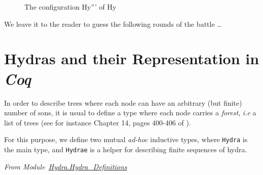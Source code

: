 \begin{figure}[hp]
\caption{The configuration Hy''' of Hy \label{fig:Hy5}}
\end{figure}
\FloatBarrier

We leave it to the reader  to guess the following  rounds of the battle \dots



\section{Hydras and their Representation in \emph{Coq}}
\label{sec:orgheadline48}



In order to describe trees where each node can have an arbitrary (but finite) number of sons, it is usual to define a type where each node carries a \emph{forest}, \emph{i.e} a list of trees
(see for instance Chapter 14, pages 400-406 of \cite{BC04}).

For this purpose, we define two mutual \emph{ad-hoc}  inductive types, where \texttt{Hydra} is the main type, and \texttt{Hydrae} is a helper for describing finite sequences of hydra.
\label{types:Hydra}
\label{types:Hydrae}

\vspace{4pt}
\noindent
\emph{From Module~\href{../theories/html/hydras.Hydra.Hydra_Definitions.html\#Hydra}{Hydra.Hydra\_Definitions}}

